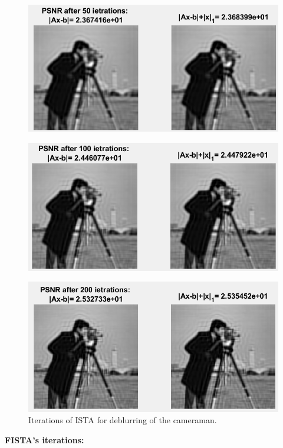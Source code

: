 \documentclass[12pt]{article}
\begin{document}
\begin{figure}[H]
  \centering
    \includegraphics[scale=0.6]{Ista50.png}
 \end{figure}
 \begin{figure}[H]
    \centering
    \includegraphics[scale=0.6]{Ista100.png}
\end{figure}
\begin{figure}[H]
    \centering
    \includegraphics[scale=0.6]{Ista200.png}
  \caption{Iterations of ISTA for deblurring of the cameraman.}
  \label{fig:ISTA}
\end{figure}
\textbf{FISTA's iterations:}
\end{document}
